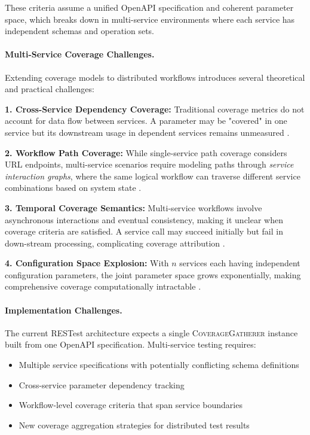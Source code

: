 \documentclass[conference]{IEEEtran}
\begin{document}
These criteria assume a unified OpenAPI specification and coherent parameter space, which breaks down in multi-service environments where each service has independent schemas and operation sets.

\paragraph{Multi-Service Coverage Challenges.}
Extending coverage models to distributed workflows introduces several theoretical and practical challenges:

\textbf{1. Cross-Service Dependency Coverage:} Traditional coverage metrics do not account for data flow between services. A parameter may be "covered" in one service but its downstream usage in dependent services remains unmeasured \cite{zhou2018microservice}.

\textbf{2. Workflow Path Coverage:} While single-service path coverage considers URL endpoints, multi-service scenarios require modeling paths through \emph{service interaction graphs}, where the same logical workflow can traverse different service combinations based on system state \cite{waseem2020testing}.

\textbf{3. Temporal Coverage Semantics:} Multi-service workflows involve
asynchronous interactions and eventual consistency, making it unclear when
coverage criteria are satisfied. A service call may succeed initially but fail in
down-stream processing, complicating coverage attribution
\cite{laigner2024event}.


\textbf{4. Configuration Space Explosion:} With $n$ services each having independent configuration parameters, the joint parameter space grows exponentially, making comprehensive coverage computationally intractable \cite{arcuri2019restful}.

\paragraph{Implementation Challenges.}
The current RESTest architecture expects a single \textsc{CoverageGatherer} instance built from one OpenAPI specification. Multi-service testing requires:
\begin{itemize}[leftmargin=*]
    \item Multiple service specifications with potentially conflicting schema definitions
    \item Cross-service parameter dependency tracking
    \item Workflow-level coverage criteria that span service boundaries
    \item New coverage aggregation strategies for distributed test results
\end{itemize}









\end{document}
